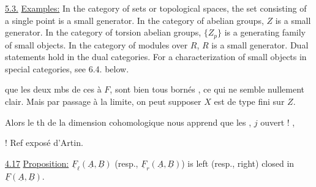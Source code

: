 \uline{5.3.} \uline{Examples:} In the category of sets or topological spaces,
the set consisting of a single point is a small generator. In
the category of abelian groups, $Z$ is a small generator. In
the category of torsion abelian groups, $\{Z_p\}$ is a generating
family of small objects. In the category of modules over $R$,
$R$ is a small generator. Dual statements hold in the dual
categories. For a characterization of small objects in special
categories, see 6.4. below.


que 
les deux mbs de ces  à $F$, sont
bien tous bornés , ce qui ne semble
nullement clair. Mais par passage à la limite,
on peut supposer $X$ est de type fini sur $Z$.

Alors le th de la dimension cohomologique
nous apprend que les
, $j$ ouvert
 ! , 

! Ref exposé d'Artin.


\uline{4.17} \uline{Proposition:} $\underline{F}_\ell(\underline{A},\underline{B})$ (resp., $\underline{F}_r(\underline{A},\underline{B})$) is left (resp.,
right) closed in $\underline{F}(\underline{A},\underline{B})$.

